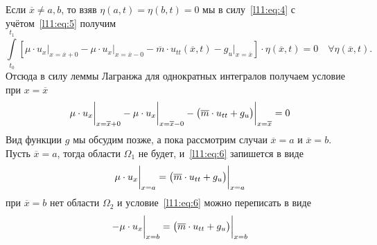Если $\overline{x}\neq a,b$, то взяв $\eta(a,t)=\eta(b,t)=0$ мы в силу~\eqref{l11:eq:4} с учётом~\eqref{l11:eq:5} получим
\begin{equation*}
	\int\limits_{t_0}^{t_1}\left[\mu\cdot u_x\bigg|_{x=\overline{x}+0}-\mu\cdot u_x\bigg|_{x=\overline{x}-0}-\overline{m}\cdot u_{tt}(\overline{x},t)-g_u\bigg|_{x=\overline{x}}\right]\cdot\eta(\overline{x},t)=0\quad\forall \eta(\overline{x},t).
\end{equation*}
Отсюда в силу леммы Лагранжа для однократных интегралов получаем условие при $x=\overline{x}$
\begin{equation}
	\label{l11:eq:6}
	\hfill \mu\cdot u_x\bigg|_{x=\overline{x}+0}-\mu\cdot u_x\bigg|_{x=\overline{x}-0}-\big(\overline{m}\cdot u_{tt}+g_u\big)\bigg|_{x=\overline{x}}=0\hfill
\end{equation}
Вид функции $g$ мы обсудим позже, а пока рассмотрим случаи $\overline{x}=a$ и $\overline{x}=b$. Пусть $\overline{x}=a$, тогда области $\Omega_1$ не будет, и~\eqref{l11:eq:6} запишется в виде 
\begin{equation}
	\label{l11:eq:7}
	\hfill\mu\cdot u_x\bigg|_{x=a}=\big(\overline{m}\cdot u_{tt}+g_u\big)\bigg|_{x=a}\hfill
\end{equation}
при $\overline{x}=b$ нет области $\Omega_2$ и условие~\eqref{l11:eq:6} можно переписать в виде 
\begin{equation}
	\label{l11:eq:8}
	\hfill-\mu\cdot u_x\bigg|_{x=b}=\big(\overline{m}\cdot u_{tt}+g_u\big)\bigg|_{x=b}\hfill
\end{equation} 

